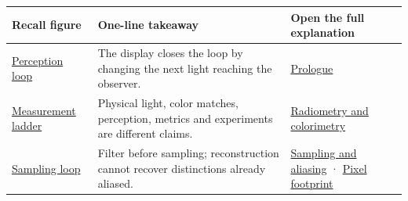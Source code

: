 {\def\LTcaptype{none} %
\begin{longtable}[]{@{}
  >{\raggedright\arraybackslash}p{}
  >{\raggedright\arraybackslash}p{}
  >{\raggedright\arraybackslash}p{}@{}}
\toprule\noalign{}
\begin{minipage}[b]{\linewidth}\raggedright
Recall figure
\end{minipage} & \begin{minipage}[b]{\linewidth}\raggedright
One-line takeaway
\end{minipage} & \begin{minipage}[b]{\linewidth}\raggedright
Open the full explanation
\end{minipage} \\
\midrule\noalign{}
\endhead
\bottomrule\noalign{}
\endlastfoot
\hyperref[appendix-73c6b8ed5a87-from-emitted-light-to-a-perceptual-claim]{Perception loop} & The display closes the loop by changing the next light reaching the observer. & \href{Continuous\%20Notes/University\%20-\%20Worlds,\%20Images\%20and\%20Inference\%20-\%20Graphics,\%20Vision\%20and\%20Photography\#Prologue\%20-\%20A\%20perfect\%20scene\%20can\%20still\%20make\%20a\%20poor\%20experience/}{Prologue} \\
\hyperref[appendix-73c6b8ed5a87-four-measurement-families-that-must-not-be-collapsed]{Measurement ladder} & Physical light, color matches, perception, metrics and experiments are different claims. & \href{Continuous\%20Notes/University\%20-\%20Worlds,\%20Images\%20and\%20Inference\%20-\%20Graphics,\%20Vision\%20and\%20Photography\#Light\%20must\%20become\%20a\%20quantity\%20before\%20it\%20becomes\%20a\%20color/}{Radiometry and colorimetry} \\
\hyperref[appendix-73c6b8ed5a87-sampling-and-filtering-preserve-what-can-be-distinguished]{Sampling loop} & Filter before sampling; reconstruction cannot recover distinctions already aliased. & \href{Continuous\%20Notes/University\%20-\%20Worlds,\%20Images\%20and\%20Inference\%20-\%20Graphics,\%20Vision\%20and\%20Photography\#Sampling\%20is\%20a\%20question\%20of\%20what\%20remains\%20distinguishable/}{Sampling and aliasing} · \href{Continuous\%20Notes/University\%20-\%20Worlds,\%20Images\%20and\%20Inference\%20-\%20Graphics,\%20Vision\%20and\%20Photography\#A\%20footprint\%20is\%20more\%20meaningful\%20than\%20an\%20isolated\%20pixel\%20center/}{Pixel footprint} \\

\end{longtable}}
